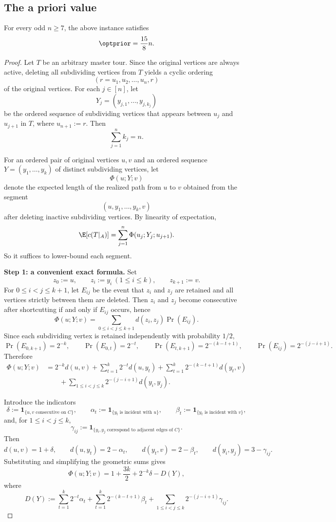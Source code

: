 \subsection*{The a priori value}

\begin{proposition}\label{prop:single-prior}
For every odd $n\ge 7$, the above instance satisfies
\[
\optprior=\frac{15}{8}n.
\]
\end{proposition}

\begin{proof}
Let $T$ be an arbitrary master tour. Since the original vertices are always active, deleting all subdividing vertices from $T$ yields a cyclic ordering
\[
(r=u_1,u_2,\dots,u_n,r)
\]
of the original vertices. For each $j\in[n]$, let
\[
Y_j=(y_{j,1},\dots,y_{j,k_j})
\]
be the ordered sequence of subdividing vertices that appears between $u_j$ and $u_{j+1}$ in $T$, where $u_{n+1}:=r$. Then
\[
\sum_{j=1}^n k_j=n.
\]

For an ordered pair of original vertices $u,v$ and an ordered sequence $Y=(y_1,\dots,y_k)$ of distinct subdividing vertices, let
\[
\Phi(u;Y;v)
\]
denote the expected length of the realized path from $u$ to $v$ obtained from the segment
\[
(u,y_1,\dots,y_k,v)
\]
after deleting inactive subdividing vertices. By linearity of expectation,
\[
\E[c(T|_A)]
=
\sum_{j=1}^n \Phi(u_j;Y_j;u_{j+1}).
\]
So it suffices to lower-bound each segment.

\medskip
\noindent\textbf{Step 1: a convenient exact formula.}
Set
\[
z_0:=u,\qquad z_i:=y_i\ (1\le i\le k),\qquad z_{k+1}:=v.
\]
For $0\le i<j\le k+1$, let $E_{ij}$ be the event that $z_i$ and $z_j$ are retained and all vertices strictly between them are deleted. Then $z_i$ and $z_j$ become consecutive after shortcutting if and only if $E_{ij}$ occurs, hence
\[
\Phi(u;Y;v)=\sum_{0\le i<j\le k+1} d(z_i,z_j)\Pr(E_{ij}).
\]
Since each subdividing vertex is retained independently with probability $1/2$,
\[
\Pr(E_{0,k+1})=2^{-k},\qquad
\Pr(E_{0,t})=2^{-t},\qquad
\Pr(E_{t,k+1})=2^{-(k-t+1)},\qquad
\Pr(E_{ij})=2^{-(j-i+1)}.
\]
Therefore
\begin{align*}
\Phi(u;Y;v)
&=
2^{-k}d(u,v)
+\sum_{t=1}^k 2^{-t}d(u,y_t)
+\sum_{t=1}^k 2^{-(k-t+1)}d(y_t,v) \\
&\qquad
+\sum_{1\le i<j\le k}2^{-(j-i+1)}d(y_i,y_j).
\end{align*}

Introduce the indicators
\[
\delta:=\mathbf 1_{\{u,v\text{ consecutive on }C\}},
\qquad
\alpha_t:=\mathbf 1_{\{y_t\text{ is incident with }u\}},
\qquad
\beta_t:=\mathbf 1_{\{y_t\text{ is incident with }v\}},
\]
and, for $1\le i<j\le k$,
\[
\gamma_{ij}:=\mathbf 1_{\{y_i,y_j\text{ correspond to adjacent edges of }C\}}.
\]
Then
\[
d(u,v)=1+\delta,
\qquad
 d(u,y_t)=2-\alpha_t,
\qquad
 d(y_t,v)=2-\beta_t,
\qquad
 d(y_i,y_j)=3-\gamma_{ij}.
\]
Substituting and simplifying the geometric sums gives
\[
\Phi(u;Y;v)=1+\frac{3k}{2}+2^{-k}\delta-D(Y),
\]
where
\[
D(Y):=
\sum_{t=1}^k 2^{-t}\alpha_t
+\sum_{t=1}^k 2^{-(k-t+1)}\beta_t
+\sum_{1\le i<j\le k}2^{-(j-i+1)}\gamma_{ij}.
\]


\end{proof}
